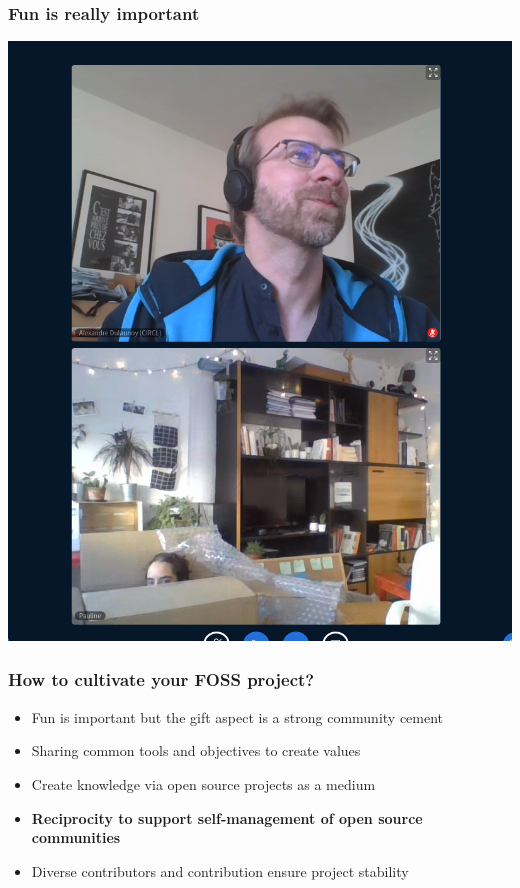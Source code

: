 \documentclass{beamer}
\begin{document}
\begin{frame}[fragile]
        \frametitle{Fun is really important}
        \includegraphics[scale=0.2]{./images/boite.png}
\end{frame}

\begin{frame}
        \frametitle{How to cultivate your FOSS project?}
        \begin{itemize}
                \item Fun is important but the gift aspect is a strong community cement
                \item Sharing common tools and objectives to create values
                \item Create knowledge via open source projects as a medium
                \item {\bf Reciprocity to support self-management of open source communities}
                \item Diverse contributors and contribution ensure project stability
        \end{itemize}
\end{frame}
\end{document}

